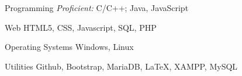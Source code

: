

\begin{cvskills}

  \cvskill
    {Programming} %
    {{\em Proficient:} C/C++;\hspace{0.5em}{\em Experienced:} Java, JavaScript } %

  \cvskill
    {Web} %
    {HTML5, CSS, Javascript, SQL, PHP} %

  \cvskill
    {Operating Systems} %
    {Windows, Linux} %

  \cvskill
    {Utilities} %
    {Github, Bootstrap, MariaDB, \LaTeX, XAMPP, MySQL} %
    
\end{cvskills}
